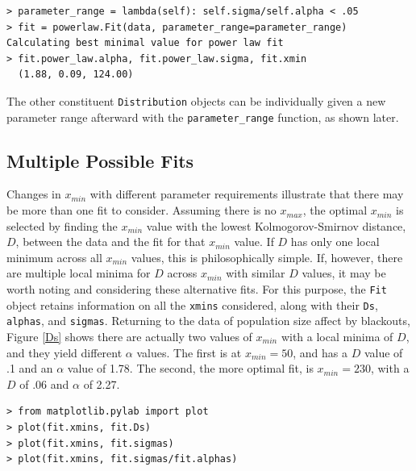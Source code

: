 \documentclass[10pt]{article}
\begin{document}
\begin{verbatim}
> parameter_range = lambda(self): self.sigma/self.alpha < .05
> fit = powerlaw.Fit(data, parameter_range=parameter_range)
Calculating best minimal value for power law fit
> fit.power_law.alpha, fit.power_law.sigma, fit.xmin
  (1.88, 0.09, 124.00)  
\end{verbatim}

The other constituent \verb"Distribution" objects can be individually given a new parameter range afterward with the \verb$parameter_range$ function, as shown later.

\subsection*{Multiple Possible Fits}
Changes in $x_{min}$ with different parameter requirements illustrate that there may be more than one fit to consider. Assuming there is no $x_{max}$, the optimal $x_{min}$ is selected by finding the $x_{min}$ value with the lowest Kolmogorov-Smirnov distance, $D$, between the data and the fit for that $x_{min}$ value. If $D$ has only one local minimum across all $x_{min}$ values, this is philosophically simple. If, however, there are multiple local minima for $D$ across $x_{min}$ with similar $D$ values, it may be worth noting and considering these alternative fits. For this purpose, the \verb$Fit$ object retains information on all the \verb$xmins$ considered, along with their \verb$Ds$, \verb$alphas$, and \verb$sigmas$. Returning to the data of population size affect by blackouts, Figure \ref{Ds} shows there are actually two values of $x_{min}$ with a local minima of $D$, and they yield different $\alpha$ values. The first is at $x_{min}=50$, and has a $D$ value of .1 and an $\alpha$ value of 1.78. The second, the more optimal fit, is $x_{min}=230$, with a $D$ of .06 and $\alpha$ of 2.27.

\begin{verbatim}
> from matplotlib.pylab import plot
> plot(fit.xmins, fit.Ds)
> plot(fit.xmins, fit.sigmas)
> plot(fit.xmins, fit.sigmas/fit.alphas)
\end{verbatim}
\end{document}
